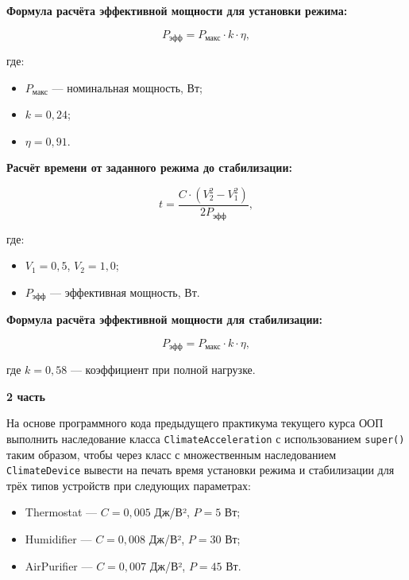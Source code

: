 \begin{enumerate}
\textbf{Формула расчёта эффективной мощности для установки режима:}

\begin{equation}
P_{\text{эфф}} = P_{\text{макс}} \cdot k \cdot \eta,
\end{equation}

где:  
\begin{itemize}
    \item $P_{\text{макс}}$ — номинальная мощность, Вт;  
    \item $k = 0{,}24$;  
    \item $\eta = 0{,}91$.  
\end{itemize}

\textbf{Расчёт времени от заданного режима до стабилизации:}

\begin{equation}
t = \frac{C \cdot (V_2^2 - V_1^2)}{2P_{\text{эфф}}},
\end{equation}

где:  
\begin{itemize}
    \item $V_1 = 0{,}5$, $V_2 = 1{,}0$;  
    \item $P_{\text{эфф}}$ — эффективная мощность, Вт.  
\end{itemize}

\textbf{Формула расчёта эффективной мощности для стабилизации:}

\begin{equation}
P_{\text{эфф}} = P_{\text{макс}} \cdot k \cdot \eta,
\end{equation}

где $k = 0{,}58$ — коэффициент при полной нагрузке.

\textbf{2 часть}

На основе программного кода предыдущего практикума текущего курса ООП выполнить наследование класса \texttt{ClimateAcceleration} с использованием \texttt{super()} таким образом, чтобы через класс с множественным наследованием \texttt{ClimateDevice} вывести на печать время установки режима и стабилизации для трёх типов устройств при следующих параметрах:

\begin{itemize}
    \item Thermostat — $C = 0{,}005$ Дж/В², $P = 5$ Вт;  
    \item Humidifier — $C = 0{,}008$ Дж/В², $P = 30$ Вт;  
    \item AirPurifier — $C = 0{,}007$ Дж/В², $P = 45$ Вт.  
\end{itemize}


\end{enumerate}
